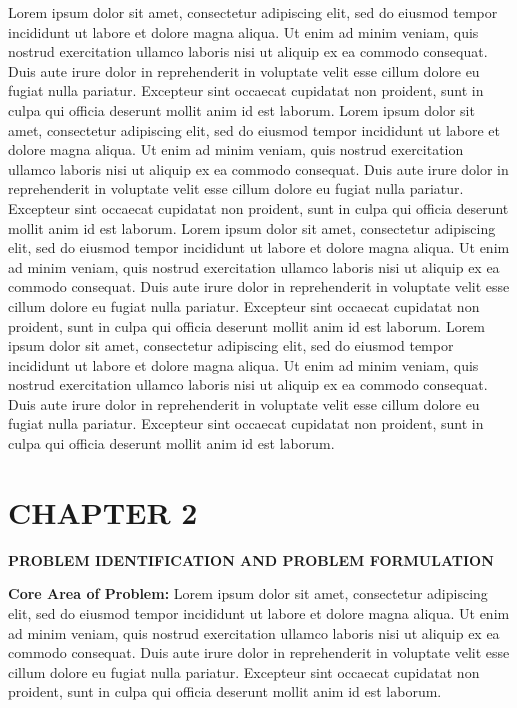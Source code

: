 \documentclass[12pt]{article}
\newcommand{\centersection}[1]{%
  \begin{center}
    \fontfamily{ptm}\fontsize{14}{16}\selectfont\bfseries\uppercase{#1}
  \end{center}
}
\begin{document}
\fontsize{12}{14}\selectfont
Lorem ipsum dolor sit amet, consectetur adipiscing elit, sed do eiusmod tempor incididunt ut labore et dolore magna aliqua. Ut enim ad minim veniam, quis nostrud exercitation ullamco laboris nisi ut aliquip ex ea commodo consequat. Duis aute irure dolor in reprehenderit in voluptate velit esse cillum dolore eu fugiat nulla pariatur. Excepteur sint occaecat cupidatat non proident, sunt in culpa qui officia deserunt mollit anim id est laborum.
Lorem ipsum dolor sit amet, consectetur adipiscing elit, sed do eiusmod tempor incididunt ut labore et dolore magna aliqua. Ut enim ad minim veniam, quis nostrud exercitation ullamco laboris nisi ut aliquip ex ea commodo consequat. Duis aute irure dolor in reprehenderit in voluptate velit esse cillum dolore eu fugiat nulla pariatur. Excepteur sint occaecat cupidatat non proident, sunt in culpa qui officia deserunt mollit anim id est laborum.
Lorem ipsum dolor sit amet, consectetur adipiscing elit, sed do eiusmod tempor incididunt ut labore et dolore magna aliqua. Ut enim ad minim veniam, quis nostrud exercitation ullamco laboris nisi ut aliquip ex ea commodo consequat. Duis aute irure dolor in reprehenderit in voluptate velit esse cillum dolore eu fugiat nulla pariatur. Excepteur sint occaecat cupidatat non proident, sunt in culpa qui officia deserunt mollit anim id est laborum.
Lorem ipsum dolor sit amet, consectetur adipiscing elit, sed do eiusmod tempor incididunt ut labore et dolore magna aliqua. Ut enim ad minim veniam, quis nostrud exercitation ullamco laboris nisi ut aliquip ex ea commodo consequat. Duis aute irure dolor in reprehenderit in voluptate velit esse cillum dolore eu fugiat nulla pariatur. Excepteur sint occaecat cupidatat non proident, sunt in culpa qui officia deserunt mollit anim id est laborum.


\section*{CHAPTER 2}
\centersection{PROBLEM IDENTIFICATION AND PROBLEM FORMULATION}

\fontsize{12}{14}\selectfont
\textbf{Core Area of Problem:} Lorem ipsum dolor sit amet, consectetur adipiscing elit, sed do eiusmod tempor incididunt ut labore et dolore magna aliqua. Ut enim ad minim veniam, quis nostrud exercitation ullamco laboris nisi ut aliquip ex ea commodo consequat. Duis aute irure dolor in reprehenderit in voluptate velit esse cillum dolore eu fugiat nulla pariatur. Excepteur sint occaecat cupidatat non proident, sunt in culpa qui officia deserunt mollit anim id est laborum.
\end{document}
